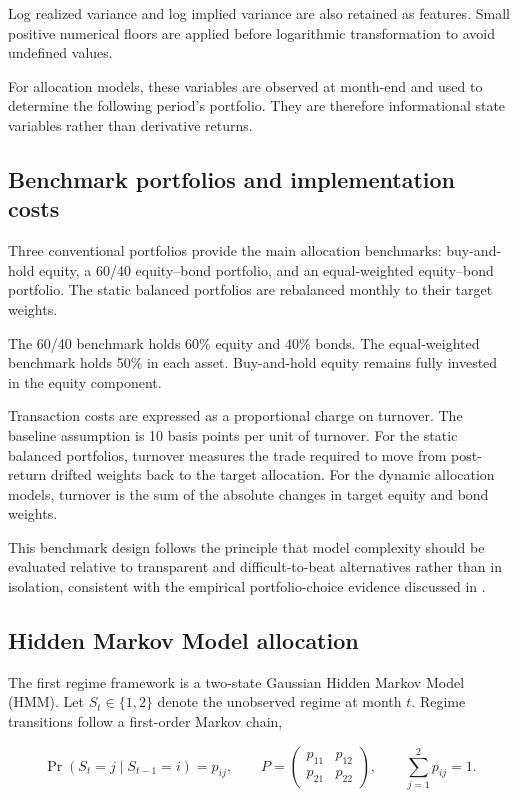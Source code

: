 Log realized variance and log implied variance are also retained as features. Small positive numerical floors are applied before logarithmic transformation to avoid undefined values.

For allocation models, these variables are observed at month-end and used to determine the following period's portfolio. They are therefore informational state variables rather than derivative returns.

\subsection{Benchmark portfolios and implementation costs}

Three conventional portfolios provide the main allocation benchmarks: buy-and-hold equity, a 60/40 equity--bond portfolio, and an equal-weighted equity--bond portfolio. The static balanced portfolios are rebalanced monthly to their target weights.

The 60/40 benchmark holds 60\% equity and 40\% bonds. The equal-weighted benchmark holds 50\% in each asset. Buy-and-hold equity remains fully invested in the equity component.

Transaction costs are expressed as a proportional charge on turnover. The baseline assumption is 10 basis points per unit of turnover. For the static balanced portfolios, turnover measures the trade required to move from post-return drifted weights back to the target allocation. For the dynamic allocation models, turnover is the sum of the absolute changes in target equity and bond weights.

This benchmark design follows the principle that model complexity should be evaluated relative to transparent and difficult-to-beat alternatives rather than in isolation, consistent with the empirical portfolio-choice evidence discussed in \textcite{DeMiguelGarlappiUppal2009}.

\subsection{Hidden Markov Model allocation}

The first regime framework is a two-state Gaussian Hidden Markov Model (HMM). Let
$S_t \in \{1,2\}$ denote the unobserved regime at month $t$. Regime transitions follow a
first-order Markov chain,

\begin{equation}
\Pr(S_t=j \mid S_{t-1}=i)
=
p_{ij},
\qquad
P
=
\begin{pmatrix}
p_{11} & p_{12} \\
p_{21} & p_{22}
\end{pmatrix},
\qquad
\sum_{j=1}^{2} p_{ij}=1.
\end{equation}

